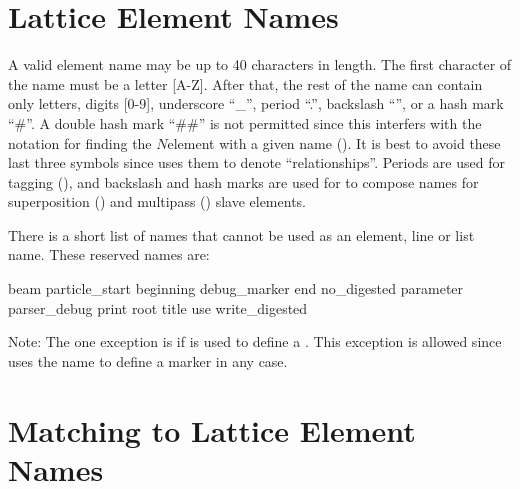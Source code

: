 \section{Lattice Element Names}
\label{s:ele.names}

A valid element name may be up to 40 characters in length. The first character of the name must be a
letter [A-Z]. After that, the rest of the name can contain only letters, digits [0-9], underscore
``_'', period ``.'', backslash ``\B'', or a hash mark ``\#''. A double hash mark ``\#\#'' is not
permitted since this interfers with the notation for finding the $N$\Th element with a given name
(). It is best to avoid these last three symbols since \bmad uses them to denote
``relationships''. Periods are used for tagging (), and backslash and hash marks are
used for to compose names for superposition () and multipass ()
slave elements.

There is a short list of names that cannot be used as an element, line or list name. These reserved names are:
\begin{example}
  beam
  particle_start
  beginning
  debug_marker
  end
  no_digested
  parameter
  parser_debug
  print
  root
  title
  use
  write_digested
\end{example}
Note: The one exception is if  is used to define a . This exception is allowed
since \bmad uses the  name to define a marker in any case.

\section{Matching to Lattice Element Names}
\label{s:ele.match}

